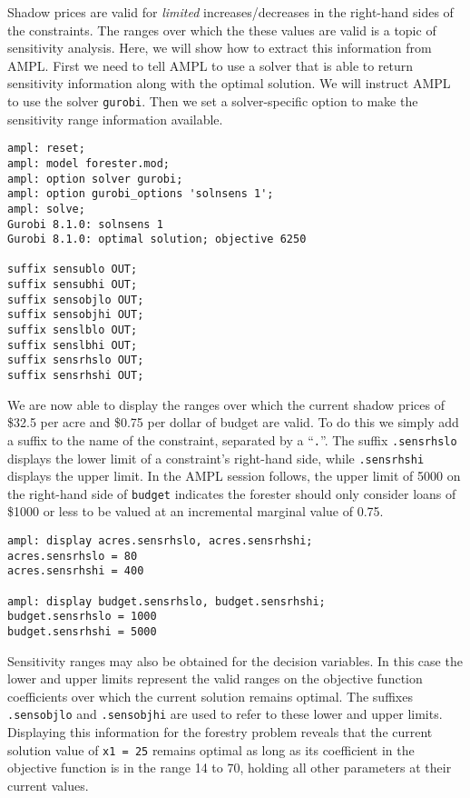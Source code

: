 Shadow prices are valid for \emph{limited} increases/decreases in the
right-hand sides of the constraints. The ranges over which the these
values are valid is a topic of sensitivity analysis. Here, we will
show how to extract this information from AMPL. First we need to tell
AMPL to use a solver that is able to return sensitivity information
along with the optimal solution. We will instruct AMPL to use the solver
\texttt{gurobi}. Then we set a solver-specific option to make the
sensitivity range information available.

\begin{Verbatim}[samepage=true]
ampl: reset;
ampl: model forester.mod;
ampl: option solver gurobi;
ampl: option gurobi_options 'solnsens 1'; 
ampl: solve;
Gurobi 8.1.0: solnsens 1
Gurobi 8.1.0: optimal solution; objective 6250

suffix sensublo OUT;
suffix sensubhi OUT;
suffix sensobjlo OUT;
suffix sensobjhi OUT;
suffix senslblo OUT;
suffix senslbhi OUT;
suffix sensrhslo OUT;
suffix sensrhshi OUT;
\end{Verbatim}

We are now able to display the ranges over which the current shadow
prices of \$32.5 per acre and \$0.75 per dollar of budget are
valid. To do this we simply add a suffix to the name of the
constraint, separated by a ``\texttt{.}''. The suffix
\texttt{.sensrhslo} displays the lower limit of a constraint's
right-hand side, while \texttt{.sensrhshi} displays the upper limit.
In the AMPL session follows, the
upper limit of 5000 on the right-hand side of \texttt{budget}
indicates the forester should only consider loans of \$1000 or less to
be valued at an incremental marginal value of 0.75.

\begin{Verbatim}[samepage=true]
ampl: display acres.sensrhslo, acres.sensrhshi;
acres.sensrhslo = 80
acres.sensrhshi = 400

ampl: display budget.sensrhslo, budget.sensrhshi;
budget.sensrhslo = 1000
budget.sensrhshi = 5000
\end{Verbatim}

Sensitivity ranges may also be obtained for the decision variables. In
this case the lower and upper limits represent the valid ranges on the
objective function coefficients over which the current solution
remains optimal.  The suffixes \texttt{.sensobjlo} and
\texttt{.sensobjhi} are used to refer to these lower and upper limits.
Displaying this information for the forestry problem reveals that the
current solution value of \texttt{x1 = 25} remains optimal as long as
its coefficient in the objective function is in the range 14 to 70,
holding all other parameters at their current values.

